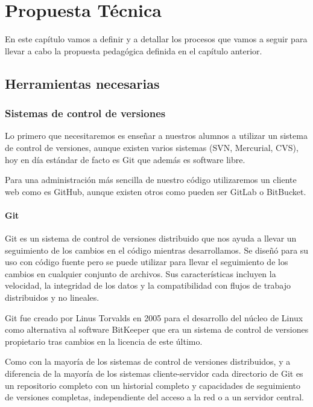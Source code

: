 \chapter{Propuesta Técnica}

En este capítulo vamos a definir y a detallar los procesos que vamos a seguir para llevar a cabo la propuesta pedagógica definida en el capítulo anterior.

\section{Herramientas necesarias}

\subsection{Sistemas de control de versiones}

Lo primero que necesitaremos es enseñar a nuestros alumnos a utilizar un sistema de control de versiones, aunque existen varios sistemas (SVN, Mercurial, CVS), hoy en día estándar de facto es Git que además es software libre.

Para una administración más sencilla de nuestro código utilizaremos un cliente web como es GitHub, aunque existen otros como pueden ser GitLab o BitBucket.

\subsubsection {Git}

Git es un sistema de control de versiones distribuido que nos ayuda a llevar un seguimiento de los cambios en el código mientras desarrollamos. Se diseñó para su uso con código fuente pero se puede utilizar para llevar el seguimiento de los cambios en cualquier conjunto de archivos. Sus características incluyen la velocidad, la integridad de los datos y la compatibilidad con flujos de trabajo distribuidos y no lineales.

Git fue creado por Linus Torvalds en 2005 para el desarrollo del núcleo de Linux como alternativa al software BitKeeper que era un sistema de control de versiones propietario tras cambios en la licencia de este último.

Como con la mayoría de los sistemas de control de versiones distribuidos, y a diferencia de la mayoría de los sistemas cliente-servidor cada directorio de Git es un repositorio completo con un historial completo y capacidades de seguimiento de versiones completas, independiente del acceso a la red o a un servidor central.

